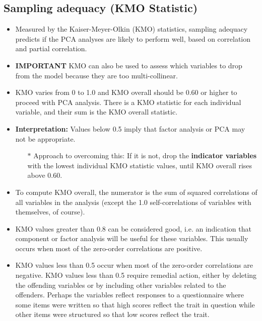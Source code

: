\documentclass[a4paper,12pt]{article}
\begin{document}
\subsection{Sampling adequacy (KMO Statistic)}
\begin{itemize}
\item Measured by the Kaiser-Meyer-Olkin (KMO) statistics, sampling adequacy predicts if the PCA analyses are likely to perform well, based on correlation and partial correlation. 
\item \textbf{IMPORTANT} KMO can also be used to assess which variables to drop from the model because they are too multi-collinear.

\item KMO varies from 0 to 1.0 and KMO overall should be 0.60 or higher to proceed with PCA analysis. There is a KMO statistic for each individual variable, and their sum is the KMO overall statistic. 
\item \textbf{Interpretation:} Values below 0.5 imply that factor analysis or PCA may not be appropriate.
\begin{itemize}
\item[$\ast$] Approach to overcoming this: If it is not, drop the \textbf{indicator variables} with the lowest individual KMO statistic values, until KMO overall rises above 0.60.
\end{itemize} 

\item To compute KMO overall, the numerator is the sum of squared correlations of all variables in the analysis (except the 1.0 self-correlations of variables with themselves, of course). 

\end{itemize}

\begin{itemize}
\item KMO values greater than 0.8 can be considered good, i.e. an indication that component or factor analysis will be useful for these variables. This usually occurs when most of the zero-order correlations are positive. 
\item KMO values less than 0.5 occur when most of the zero-order correlations are negative. KMO values less than 0.5 require remedial action, either by deleting the offending variables or by including other variables related to the offenders. Perhaps the variables reflect responses to a questionnaire where some items were written so that high scores reflect the trait in question while other items were structured so that low scores reflect the trait. 
\end{itemize}
\end{document}
